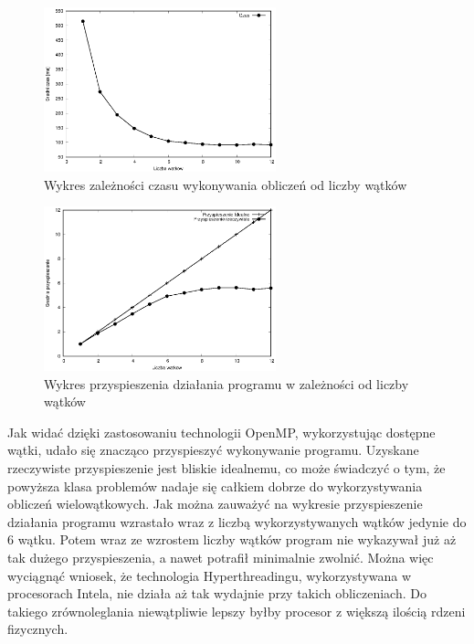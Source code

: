 \documentclass[a4paper,12pt]{article}
\begin{document}
\begin{figure}[!ht]
	\centering
  \includegraphics[width=0.6\textwidth]{dane/wykresCzas.eps}
  \caption{Wykres zależności czasu wykonywania obliczeń od liczby wątków}
\end{figure}

\begin{figure}[!ht]
	\centering
  \includegraphics[width=0.6\textwidth]{dane/wykresPrzyspieszenie.eps}
  \caption{Wykres przyspieszenia działania programu w zależności od liczby wątków}
\end{figure}


Jak widać dzięki zastosowaniu technologii OpenMP, wykorzystując dostępne wątki, udało się znacząco przyspieszyć wykonywanie programu. Uzyskane rzeczywiste przyspieszenie jest bliskie idealnemu, co może świadczyć o tym, że powyższa klasa problemów nadaje się całkiem dobrze do wykorzystywania obliczeń wielowątkowych.
Jak można zauważyć na wykresie przyspieszenie działania programu wzrastało wraz z liczbą wykorzystywanych wątków jedynie do 6 wątku. Potem wraz ze wzrostem liczby wątków program nie wykazywał już aż tak dużego przyspieszenia, a nawet potrafił minimalnie zwolnić. Można więc wyciągnąć wniosek, że technologia Hyperthreadingu, wykorzystywana w procesorach Intela, nie działa aż tak wydajnie przy takich obliczeniach. Do takiego zrównoleglania niewątpliwie lepszy byłby procesor z większą ilością rdzeni fizycznych.
\end{document}

